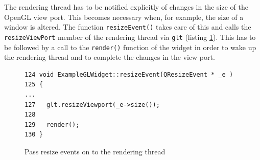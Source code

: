 \documentclass[jou,noapacite]{apa}
\begin{document}
%
The rendering thread has to be notified explicitly of changes in the size of
the OpenGL view port.
%
This becomes necessary when, for example, the size of a window is altered.
%
The function \lstinline|resizeEvent()| takes care of this and calls
the \lstinline|resizeViewPort| member of the rendering thread
via \lstinline|glt| (listing \ref{lst:resize}).
%
This has to be followed by a call to the \lstinline|render()| function of the
widget in order to wake up the rendering thread and to complete the changes in
the view port.
%
\begin{figure}[h]
\begin{lstlisting}[basicstyle=\scriptsize]
124 void ExampleGLWidget::resizeEvent(QResizeEvent * _e )
125 {
...
127   glt.resizeViewport(_e->size());
128
129   render();
130 }
\end{lstlisting}
\caption{Pass resize events on to the rendering thread}
\label{lst:resize}
\end{figure}
\end{document}
